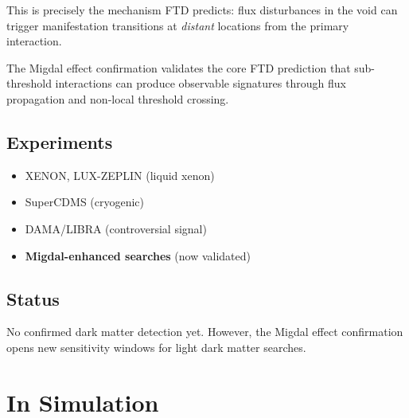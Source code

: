 \documentclass[
  11pt,
  letterpaper,
  twoside,
  openright]{book}
\providecommand{\tightlist}{%
  \setlength{\itemsep}{0pt}\setlength{\parskip}{0pt}}
\begin{document}
This is precisely the mechanism FTD predicts: flux disturbances in the
void can trigger manifestation transitions at \emph{distant} locations
from the primary interaction.

\begin{tcolorbox}[enhanced jigsaw, leftrule=.75mm, title=\textcolor{quarto-callout-note-color}{\faInfo}\hspace{0.5em}{Validation of FTD Detection Mechanism}, bottomrule=.15mm, opacityback=0, coltitle=black, arc=.35mm, colframe=quarto-callout-note-color-frame, colbacktitle=quarto-callout-note-color!10!white, colback=white, titlerule=0mm, breakable, bottomtitle=1mm, toptitle=1mm, rightrule=.15mm, toprule=.15mm, left=2mm, opacitybacktitle=0.6]

The Migdal effect confirmation validates the core FTD prediction that
sub-threshold interactions can produce observable signatures through
flux propagation and non-local threshold crossing.

\end{tcolorbox}

\subsection{Experiments}\label{experiments-29}

\begin{itemize}
\tightlist
\item
  XENON, LUX-ZEPLIN (liquid xenon)
\item
  SuperCDMS (cryogenic)
\item
  DAMA/LIBRA (controversial signal)
\item
  \textbf{Migdal-enhanced searches} (now validated)
\end{itemize}

\subsection{Status}\label{status}

No confirmed dark matter detection yet. However, the Migdal effect
confirmation opens new sensitivity windows for light dark matter
searches.

\section{In Simulation}\label{in-simulation-19}
\end{document}
